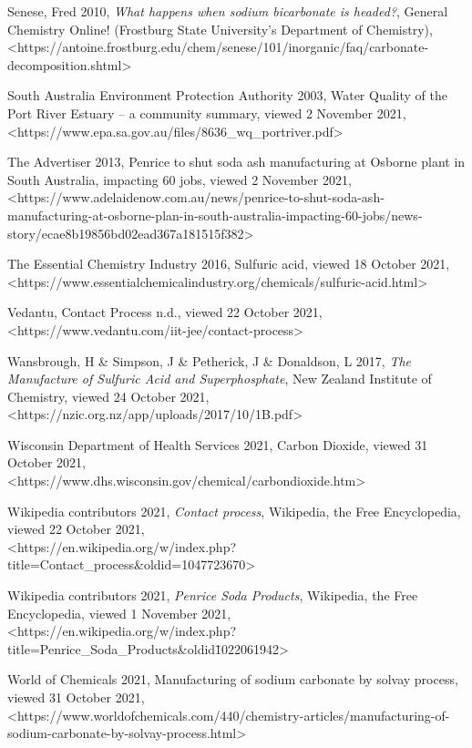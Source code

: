 \documentclass[12pt, a4paper]{article}
\begin{document}
Senese, Fred 2010, \emph{What happens when sodium bicarbonate is headed?}, General Chemistry Online! (Frostburg State University's Department of Chemistry), \\ \textless{https://antoine.frostburg.edu/chem/senese/101/inorganic/faq/carbonate-decomposition.shtml}\textgreater

South Australia Environment Protection Authority 2003, Water Quality of the Port River Estuary – a community summary, viewed 2 November 2021, \\ \textless{https://www.epa.sa.gov.au/files/8636\_wq\_portriver.pdf}\textgreater

The Advertiser 2013, Penrice to shut soda ash manufacturing at Osborne plant in South Australia, impacting 60 jobs, viewed 2 November 2021, \\ \textless{https://www.adelaidenow.com.au/news/penrice-to-shut-soda-ash-manufacturing-at-osborne-plan-in-south-australia-impacting-60-jobs/news-story/ecae8b19856bd02ead367a181515f382}\textgreater

The Essential Chemistry Industry 2016, Sulfuric acid, viewed 18 October 2021, \\ \textless{https://www.essentialchemicalindustry.org/chemicals/sulfuric-acid.html}\textgreater

Vedantu, Contact Process n.d., viewed 22 October 2021, \\ \textless{https://www.vedantu.com/iit-jee/contact-process}\textgreater

Wansbrough, H \& Simpson, J \& Petherick, J \& Donaldson, L 2017, \emph{The Manufacture of Sulfuric Acid and Superphosphate}, New Zealand Institute of Chemistry, viewed 24 October 2021, \\ \textless{https://nzic.org.nz/app/uploads/2017/10/1B.pdf}\textgreater

Wisconsin Department of Health Services 2021, Carbon Dioxide, viewed 31 October 2021, \\ \textless{https://www.dhs.wisconsin.gov/chemical/carbondioxide.htm}\textgreater

Wikipedia contributors 2021, \emph{Contact process}, Wikipedia, the Free Encyclopedia, viewed 22 October 2021, \\ \textless{https://en.wikipedia.org/w/index.php?title=Contact\_process\&oldid=1047723670}\textgreater

Wikipedia contributors 2021, \emph{Penrice Soda Products}, Wikipedia, the Free Encyclopedia, viewed 1 November 2021, \\ \textless{https://en.wikipedia.org/w/index.php?title=Penrice\_Soda\_Products\&oldid\=1022061942}\textgreater

World of Chemicals 2021, Manufacturing of sodium carbonate by solvay process, viewed 31 October 2021, \\ \textless{https://www.worldofchemicals.com/440/chemistry-articles/manufacturing-of-sodium-carbonate-by-solvay-process.html}\textgreater
\end{document}

